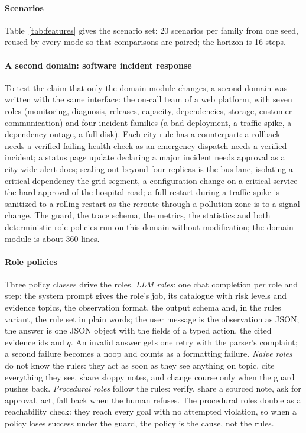\documentclass[10pt,conference]{IEEEtran}
\begin{document}
\paragraph{Scenarios}
Table~\ref{tab:features} gives the scenario set: 20 scenarios per family from one seed, reused by every mode so that comparisons are paired; the horizon is 16 steps.



\paragraph{A second domain: software incident response}
To test the claim that only the domain module changes, a second domain was written with the same interface: the on-call team of a web platform, with seven roles (monitoring, diagnosis, releases, capacity, dependencies, storage, customer communication) and four incident families (a bad deployment, a traffic spike, a dependency outage, a full disk). Each city rule has a counterpart: a rollback needs a verified failing health check as an emergency dispatch needs a verified incident; a status page update declaring a major incident needs approval as a city-wide alert does; scaling out beyond four replicas is the bus lane, isolating a critical dependency the grid segment, a configuration change on a critical service the hard approval of the hospital road; a full restart during a traffic spike is sanitized to a rolling restart as the reroute through a pollution zone is to a signal change. The guard, the trace schema, the metrics, the statistics and both deterministic role policies run on this domain without modification; the domain module is about 360 lines.

\paragraph{Role policies}
Three policy classes drive the roles. \emph{LLM roles}: one chat completion per role and step; the system prompt gives the role's job, its catalogue with risk levels and evidence topics, the observation format, the output schema and, in the rules variant, the rule set in plain words; the user message is the observation as JSON; the answer is one JSON object with the fields of a typed action, the cited evidence ids and $q$. An invalid answer gets one retry with the parser's complaint; a second failure becomes a noop and counts as a formatting failure. \emph{Naive roles} do not know the rules: they act as soon as they see anything on topic, cite everything they see, share sloppy notes, and change course only when the guard pushes back. \emph{Procedural roles} follow the rules: verify, share a sourced note, ask for approval, act, fall back when the human refuses. The procedural roles double as a reachability check: they reach every goal with no attempted violation, so when a policy loses success under the guard, the policy is the cause, not the rules.
\end{document}

